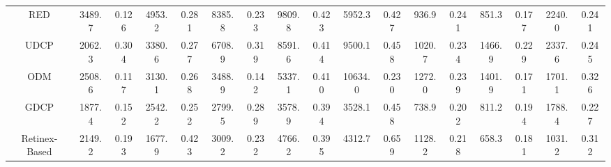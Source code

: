 \documentclass[journal]{IEEEtran}
\begin{document}
\begin{table}[htbp]
{\begin{tabular}{|c|cc|cc|cc|cc|cc|cc|cc|cc|}
RED \cite{RED}                         & 3489.7                       & 0.126                        & 4953.2                       & 0.281                        & 8385.8                        & 0.233                        & 9809.8                        & 0.423                        & 5952.3                        & 0.427                        & 936.9                        & 0.241                        & 851.3                        & 0.177                        & 2240.0                       & 0.241                        \\
UDCP \cite{UDCP}                        & 2062.3                       & 0.304                        & 3380.6                       & 0.277                        & 6708.9                        & 0.319                        & 8591.6                        & 0.414                        & 9500.1                        & 0.458                        & 1020.7                       & 0.234                        & 1466.9                       & 0.229                        & 2337.6                       & 0.245                        \\
ODM \cite{Histogram-prior}                         & 2508.6                       & 0.117                        & 3130.1                       & 0.268                        & 3488.9                        & 0.142                        & 5337.1                        & 0.410                        & 10634.0                       & 0.230                        & 1272.0                       & 0.239                        & 1401.9                       & 0.171                        & 1701.1                       & 0.326                        \\
GDCP \cite{GDCP}                         & 1877.4                       & 0.152                        & 2542.2                       & 0.252                        & 2799.5                        & 0.289                        & 3578.9                        & 0.394                        & 3528.1                        & 0.458                        & 738.9                        & 0.202                        & 811.2                        & 0.194                        & 1788.4                       & 0.227                        \\
Retinex-Based \cite{fu2014retinex}               & 2149.2                       & 0.193                        & 1677.9                       & 0.423                        & 3009.2                        & 0.232                        & 4766.2                        & 0.395                        & 4312.7                        & 0.659                        & 1128.2                       & 0.218                        & 658.3                        & 0.181                        & 1031.2                       & 0.312                        \\

\end{tabular}}
\end{table}
\end{document}
